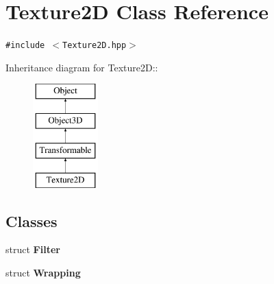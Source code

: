 \hypertarget{classm3g_1_1Texture2D}{
\section{Texture2D Class Reference}
\label{classm3g_1_1Texture2D}
}
{\tt \#include $<$Texture2D.hpp$>$}

Inheritance diagram for Texture2D::\begin{figure}[H]
\begin{center}
\leavevmode
\includegraphics[height=4cm]{classm3g_1_1Texture2D}
\end{center}
\end{figure}
\subsection*{Classes}
\begin{CompactItemize}
\item 
struct \textbf{Filter}
\item 
struct \textbf{Wrapping}
\end{CompactItemize}
